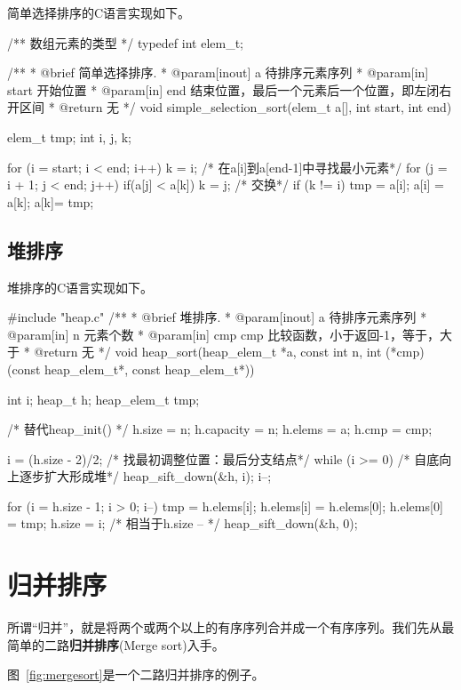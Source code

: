 简单选择排序的C语言实现如下。
\begin{Codex}[label=simple_selection_sort.c]
/** 数组元素的类型 */
typedef int elem_t;

/**
  * @brief 简单选择排序.
  * @param[inout] a 待排序元素序列
  * @param[in] start 开始位置
  * @param[in] end 结束位置，最后一个元素后一个位置，即左闭右开区间
  * @return 无
  */
void simple_selection_sort(elem_t a[], int start, int end) {
    elem_t tmp;
    int i, j, k;

    for (i = start; i < end; i++) {
        k = i;
        /* 在a[i]到a[end-1]中寻找最小元素*/
        for (j = i + 1; j < end; j++)
            if(a[j] < a[k]) k = j;
        /* 交换*/
        if (k != i) {
            tmp = a[i];
            a[i] = a[k];
            a[k]= tmp;
        }
    }
}
\end{Codex}


\subsection{堆排序}
堆排序的C语言实现如下。
\begin{Codex}[label=heap_sort.c]
#include "heap.c"
/**
  * @brief 堆排序.
  * @param[inout] a 待排序元素序列
  * @param[in] n 元素个数
  * @param[in] cmp cmp 比较函数，小于返回-1，等于，大于
  * @return 无
  */
void heap_sort(heap_elem_t *a, const int n, 
               int (*cmp)(const heap_elem_t*, const heap_elem_t*)) {
    int i;
    heap_t h;
    heap_elem_t tmp;

    /* 替代heap_init() */
    h.size = n;
    h.capacity = n;
    h.elems = a;
    h.cmp = cmp;

    i = (h.size - 2)/2;   /* 找最初调整位置：最后分支结点*/
    while (i >= 0) {  /* 自底向上逐步扩大形成堆*/
        heap_sift_down(&h, i);
        i--;
    }

    for (i = h.size - 1; i > 0; i--) {
        tmp = h.elems[i];
        h.elems[i] = h.elems[0];
        h.elems[0] = tmp;
        h.size = i; /* 相当于h.size -- */
        heap_sift_down(&h, 0);
    }
}
\end{Codex}


\section{归并排序} %
所谓“归并”，就是将两个或两个以上的有序序列合并成一个有序序列。我们先从最简单的二路\textbf{归并排序}(Merge sort)入手。

图~\ref{fig:mergesort}是一个二路归并排序的例子。

